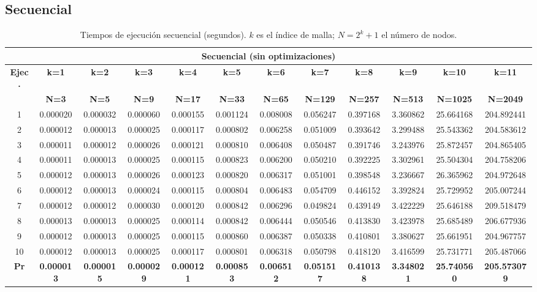 \documentclass{article}
\begin{document}
\subsection{Secuencial}

\begin{table}[H]
\centering
\tiny
\begin{tabular}{|c|c|c|c|c|c|c|c|c|c|c|c|}
\hline
\multicolumn{12}{|c|}{\textbf{Secuencial (sin optimizaciones)}} \\
\hline
\textbf{Ejec.} & \textbf{k=1} & \textbf{k=2} & \textbf{k=3} & \textbf{k=4} & \textbf{k=5} & \textbf{k=6} & \textbf{k=7} & \textbf{k=8} & \textbf{k=9} & \textbf{k=10} & \textbf{k=11} \\
\textbf{} & \textbf{N=3} & \textbf{N=5} & \textbf{N=9} & \textbf{N=17} & \textbf{N=33} & \textbf{N=65} & \textbf{N=129} & \textbf{N=257} & \textbf{N=513} & \textbf{N=1025} & \textbf{N=2049} \\
\hline
1  & 0.000020 & 0.000032 & 0.000060 & 0.000155 & 0.001124 & 0.008008 & 0.056247 & 0.397168 & 3.360862 & 25.664168 & 204.892441 \\
2  & 0.000012 & 0.000013 & 0.000025 & 0.000117 & 0.000802 & 0.006258 & 0.051009 & 0.393642 & 3.299488 & 25.543362 & 204.583612 \\
3  & 0.000011 & 0.000012 & 0.000026 & 0.000121 & 0.000810 & 0.006408 & 0.050487 & 0.391746 & 3.243976 & 25.872457 & 204.865405 \\
4  & 0.000011 & 0.000013 & 0.000025 & 0.000115 & 0.000823 & 0.006200 & 0.050210 & 0.392225 & 3.302961 & 25.504304 & 204.758206 \\
5  & 0.000012 & 0.000013 & 0.000026 & 0.000123 & 0.000820 & 0.006317 & 0.051001 & 0.398548 & 3.236667 & 26.365962 & 204.972648 \\
6  & 0.000012 & 0.000013 & 0.000024 & 0.000115 & 0.000804 & 0.006483 & 0.054709 & 0.446152 & 3.392824 & 25.729952 & 205.007244 \\
7  & 0.000012 & 0.000012 & 0.000030 & 0.000120 & 0.000842 & 0.006296 & 0.049824 & 0.439149 & 3.422229 & 25.646188 & 209.518479 \\
8  & 0.000013 & 0.000013 & 0.000025 & 0.000114 & 0.000842 & 0.006444 & 0.050546 & 0.413830 & 3.423978 & 25.685489 & 206.677936 \\
9  & 0.000012 & 0.000013 & 0.000025 & 0.000115 & 0.000860 & 0.006387 & 0.050338 & 0.410801 & 3.380627 & 25.661951 & 204.967757 \\
10 & 0.000012 & 0.000013 & 0.000025 & 0.000117 & 0.000801 & 0.006318 & 0.050798 & 0.418120 & 3.416599 & 25.731771 & 205.487066 \\
\hline
\textbf{Pr} & \textbf{0.000013} & \textbf{0.000015} & \textbf{0.000029} & \textbf{0.000121} & \textbf{0.000853} & \textbf{0.006512} & \textbf{0.051517} & \textbf{0.410138} & \textbf{3.348021} & \textbf{25.740560} & \textbf{205.573079} \\
\hline
\end{tabular}
\caption{Tiempos de ejecución secuencial (segundos). $k$ es el índice de malla; $N = 2^k+1$ el número de nodos.}
\label{tab:secuencial}
\end{table}
\end{document}
